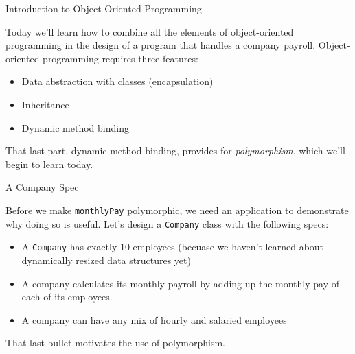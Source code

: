 \documentclass{beamer}
\author[Chris Simpkins] 
{Christopher Simpkins \\\texttt{chris.simpkins@gatech.edu}}
\institute[Georgia Tech] %
\date[CS 1331]{}
\title[\course] %
{\lesson}
\subtitle{}
\begin{document}
\begin{frame}
  \titlepage
\end{frame}

\begin{frame}[fragile]{Introduction to Object-Oriented Programming}


Today we'll learn how to combine all the elements of object-oriented programming in the design of a program that handles a company payroll.  Object-oriented programming requires three features:
\begin{itemize}
\item Data abstraction with classes (encapsulation)
\item Inheritance
\item Dynamic method binding
\end{itemize}

That last part, dynamic method binding, provides for {\it polymorphism}, which we'll begin to learn today.

\end{frame}


\begin{frame}[fragile]{A Company Spec}


Before we make {\tt monthlyPay} polymorphic, we need an application to demonstrate why doing so is useful.  Let's design a {\tt Company} class with the following specs:

\begin{itemize}
\item A {\tt Company} has exactly 10 employees (becuase we haven't learned about dynamically resized data structures yet)
\item A company calculates its monthly payroll by adding up the monthly pay of each of its employees.
\item A company can have any mix of hourly and salaried employees
\end{itemize}

That last bullet motivates the use of polymorphism.

\end{frame}
\end{document}
